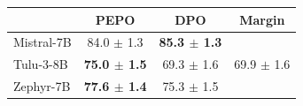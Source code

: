 \small
\begin{tabular}{lccc}
\toprule
 & PEPO & DPO & Margin \\
\midrule
Mistral-7B & 84.0 $\pm$ 1.3 & \textbf{85.3 $\pm$ 1.3} &  \\
Tulu-3-8B & \textbf{75.0 $\pm$ 1.5} & 69.3 $\pm$ 1.6 & 69.9 $\pm$ 1.6 \\
Zephyr-7B & \textbf{77.6 $\pm$ 1.4} & 75.3 $\pm$ 1.5 &  \\
\bottomrule
\end{tabular}
